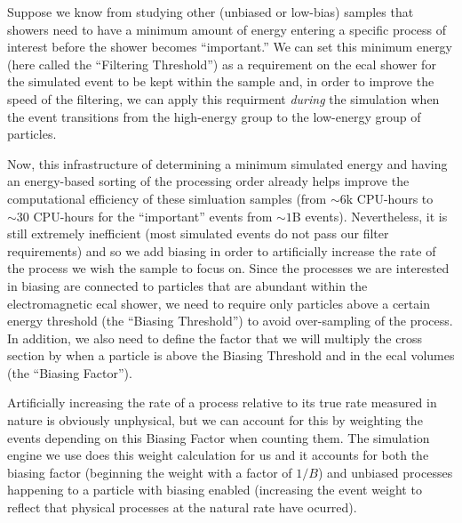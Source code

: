 Suppose we know from studying other (unbiased or low-bias) samples that showers need to have
a minimum amount of energy entering a specific process of interest before the shower
becomes ``important.''
We can set this minimum energy (here called the ``Filtering Threshold'') as a requirement on
the \ac{ecal} shower for the simulated event to be kept within the sample and, in order to
improve the speed of the filtering, we can apply this requirment \emph{during} the simulation
when the event transitions from the high-energy group to the low-energy group of particles.

Now, this infrastructure of determining a minimum simulated energy and having an energy-based
sorting of the processing order already helps improve the computational efficiency of these 
simluation samples (from $\sim 6$k CPU-hours to $\sim 30$ CPU-hours for the ``important'' events from 
$\sim 1$B events).
Nevertheless, it is still extremely inefficient (most simulated events do not pass our filter requirements)
and so we add biasing in order to artificially increase the rate of the process we wish the sample to focus on.
Since the processes we are interested in biasing are connected to particles that are abundant
within the electromagnetic \ac{ecal} shower, we need to require only particles above a
certain energy threshold (the ``Biasing Threshold'') to avoid over-sampling of the process.
In addition, we also need to define the factor that we will multiply the cross section by
when a particle is above the Biasing Threshold and in the \ac{ecal} volumes (the ``Biasing Factor'').

Artificially increasing the rate of a process relative to its true rate measured in nature
is obviously unphysical, but we can account for this by weighting the events depending on this
Biasing Factor when counting them.
The simulation engine we use does this weight calculation for us and it accounts for both the
biasing factor (beginning the weight with a factor of $1/B$) and unbiased processes happening
to a particle with biasing enabled (increasing the event weight to reflect that physical processes
at the natural rate have ocurred).

